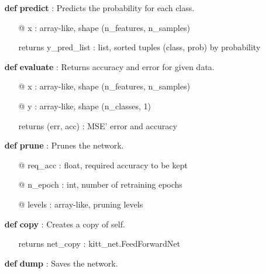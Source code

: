 {\begin{minipage}{\textwidth}
\begin{tcolorbox}[boxsep=0pt,top=10pt,left=10pt,right=10pt, bottom=10pt, arc=0pt, auto outer arc, colback=white, colframe=lightgray]
\begin{itemize}
\begin{itemize}
\item[@] n\_epoch      \hspace{22pt}	: number of epochs for backpropagation
\end{itemize}
\item[\textbf{def}] \textbf{predict} : Predicts the probability for each class.
\begin{itemize}
\item[@] x    	\hspace{50pt}	: array-like, shape (n\_features, n\_samples)  
\item[returns] y\_pred\_list \hspace{7pt}	: list, sorted tuples (class, prob) by probability
\end{itemize}
\item[\textbf{def}] \textbf{evaluate} : Returns accuracy and error for given data.
\begin{itemize}
\item[@] x    	\hspace{22pt}	: array-like, shape (n\_features, n\_samples)
\item[@] y    	\hspace{22pt}	: array-like, shape (n\_classes, 1)  
\item[returns] (err, acc) \hspace{23pt}	: MSE' error and accuracy
\end{itemize}
\item[\textbf{def}] \textbf{prune} : Prunes the network.
\begin{itemize}
\item[@] req\_acc    	\hspace{22pt}	: float, required accuracy to be kept
\item[@] n\_epoch    	\hspace{19pt}	: int, number of retraining epochs
\item[@] levels    	\hspace{35pt}	: array-like, pruning levels
\end{itemize}
\item[\textbf{def}] \textbf{copy} : Creates a copy of self.
\begin{itemize} 
\item[returns] net\_copy \hspace{15pt}	: kitt\_net.FeedForwardNet
\end{itemize}
\item[\textbf{def}] \textbf{dump} : Saves the network.
\begin{itemize} 

\end{itemize}
\end{itemize}
\end{tcolorbox}
\end{minipage}}
